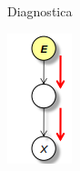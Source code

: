 \begin{figure}[!ht]
\begin{subfigure}[b]{0.14\textwidth}
        \caption{Diagnostica}
        \label{fig:diagnostica}
    \end{subfigure}
    \hfill
    \begin{subfigure}[b]{0.14\textwidth}
        \includegraphics[width=\textwidth]{./img/Reti/Causale.png}

\end{subfigure}
\end{figure}
